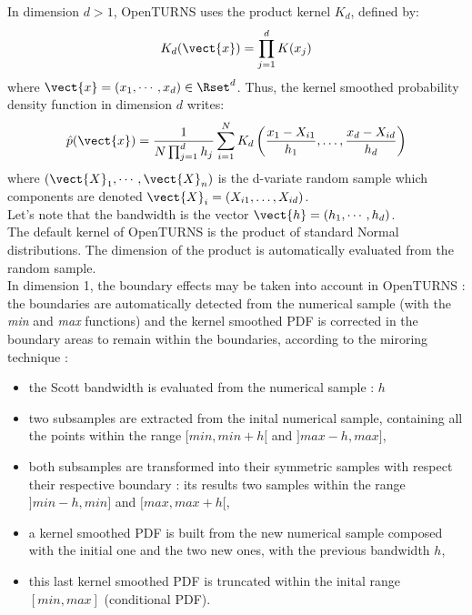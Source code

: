  In dimension $d>1$, OpenTURNS uses the product kernel $K_d$, defined by: 
  \begin{align*}
    K_d(\vect{x}) = \displaystyle \prod_{j=1}^{d} K(x_j)
  \end{align*}
 where $\vect{x} = (x_1, \cdots, x_d)\in \Rset^d$. Thus, the kernel smoothed probability density function in dimension $d$ writes:
  \begin{align*}
    \hat{p}(\vect{x}) = \displaystyle \frac{1}{N \prod_{j=1}^{d}h_j} \sum_{i=1}^{N} K_d\left(\frac{x_1 - X_{i1} }{h_1}, \dots, \frac{x_d - X_{id}}{h_d}\right)
  \end{align*}
where $(\vect{X}_1, \cdots, \vect{X}_n)$ is the d-variate random  sample which components are denoted $\vect{X}_i = (X_{i1}, \dots, X_{id})$. \\
  Let's note that the bandwidth is the vector $\vect{h} = (h_1, \cdots, h_d)$. \\
The default kernel of OpenTURNS is the product of standard Normal distributions. The dimension of the product is automatically evaluated from the random sample.\\

In dimension 1, the boundary effects may be taken into account in OpenTURNS : the boundaries are automatically detected from the numerical sample (with the \textit{min} and \textit{max} functions) and the kernel smoothed PDF is corrected in the boundary areas to remain within the boundaries, according to the miroring technique :
\begin{itemize}
\item the Scott bandwidth is evaluated from the numerical sample : $h$
\item two subsamples are extracted from the inital numerical sample, containing all the points within the range $[min, min + h[$ and  $]max-h, max]$,
\item both subsamples are transformed into their symmetric samples with respect their respective boundary : its results two samples within the range  $]min-h, min]$ and  $[max, max+h[$,
      \item a kernel smoothed PDF is built from the new numerical sample composed with the initial one and the two new ones, with the previous bandwidth $h$,
      \item this last kernel smoothed PDF is truncated within the inital range  $[min, max]$ (conditional PDF).
\end{itemize}
\vspace*{0.1cm}

